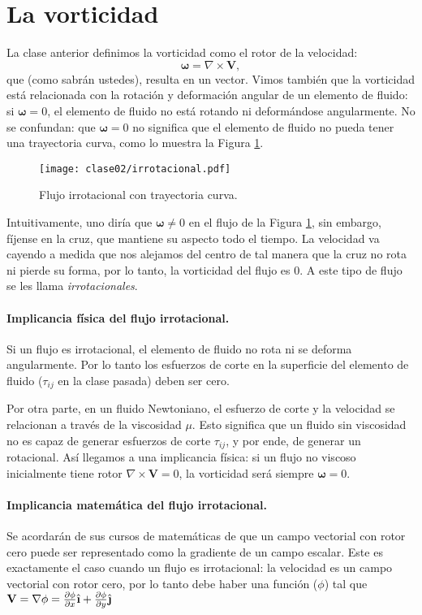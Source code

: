 \section*{La vorticidad}
La clase anterior definimos la vorticidad como el rotor de la velocidad:
%
\begin{equation}\label{eq:vort_2}
\boldsymbol{\omega} = \nabla\times\mathbf{V},
\end{equation}
%
que (como sabrán ustedes), resulta en un vector.
Vimos también que la vorticidad está relacionada con la rotación y deformación angular de un elemento de fluido: si $\boldsymbol{\omega}=0$, el elemento de fluido no está rotando ni deformándose angularmente.
No se confundan: que $\boldsymbol{\omega}=0$ no significa que el elemento de fluido no pueda tener una trayectoria curva, como lo muestra la Figura \ref{fig:irrotacional}.
%
\begin{figure}[!h]
\centering
\texttt{[image: clase02/irrotacional.pdf]}
\caption{Flujo irrotacional con trayectoria curva.}
\label{fig:irrotacional}
\end{figure}
%
Intuitivamente, uno diría que $\boldsymbol{\omega}\neq 0$ en el flujo de la Figura \ref{fig:irrotacional}, sin embargo, fíjense en la cruz, que mantiene su aspecto todo el tiempo. 
La velocidad va cayendo a medida que nos alejamos del centro de tal manera que la cruz no rota ni pierde su forma, por lo tanto, la vorticidad del flujo es $0$.
A este tipo de flujo se les llama \emph{irrotacionales}.

\paragraph*{Implicancia física del flujo irrotacional.}
Si un flujo es irrotacional, el elemento de fluido no rota ni se deforma angularmente. 
Por lo tanto los esfuerzos de corte en la superficie del elemento de fluido ($\tau_{ij}$ en la clase pasada) deben ser cero.

Por otra parte, en un fluido Newtoniano, el esfuerzo de corte y la velocidad se relacionan a través de la viscosidad $\mu$.
Esto significa que un fluido sin viscosidad no es capaz de generar esfuerzos de corte $\tau_{ij}$, y por ende, de generar un rotacional.
Así llegamos a una implicancia física: si un flujo no viscoso inicialmente tiene rotor $\nabla\times\mathbf{V}=0$, la vorticidad será siempre $\boldsymbol{\omega}=0$.

\paragraph*{Implicancia matemática del flujo irrotacional.}
Se acordarán de sus cursos de matemáticas de que un campo vectorial con rotor cero puede ser representado como la gradiente de un campo escalar.
Este es exactamente el caso cuando un flujo es irrotacional: la velocidad es un campo vectorial con rotor cero, por lo tanto debe haber una función ($\phi$) tal que $\mathbf{V} = \nabla\phi = \frac{\partial \phi}{\partial x}\ihat + \frac{\partial \phi}{\partial y}\jhat$


